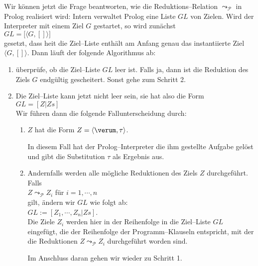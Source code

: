 Wir k\"{o}nnen jetzt die Frage beantworten, wie die Reduktions--Relation
$\leadsto_\mathcal{P}$ in Prolog realisiert wird:  Intern verwaltet Prolog eine Liste
$G\!L$ von Zielen.  Wird der Interpreter mit einem Ziel $G$ gestartet, so wird zun\"{a}chst \\[0.1cm]
\hspace*{1.3cm} $G\!L = \big[ \langle G, [] \rangle \big]$ \\[0.1cm]
gesetzt, dass hei\3t die Ziel--Liste enth\"{a}lt am Anfang genau das instantiierte Ziel $\langle G, [] \rangle$.  Dann l\"{a}uft der
folgende Algorithmus ab:
\begin{enumerate}
\item \"{u}berpr\"{u}fe, ob die Ziel--Liste $G\!L$ leer ist. 
      Falls ja, dann ist die Reduktion des Ziels $G$ endg\"{u}ltig gescheitert.
      Sonst gehe zum  Schritt 2.
\item Die Ziel--Liste kann jetzt nicht leer sein, sie hat also die Form \\[0.1cm]
      \hspace*{1.3cm} $G\!L = [ Z | Zs ]$ \\[0.1cm]
      Wir f\"{u}hren dann die folgende Fallunterscheidung durch:
      \begin{enumerate}
      \item $Z$ hat die Form $Z = \langle \verum, \tau \rangle$.

            In diesem Fall hat der Prolog--Interpreter die ihm gestellte Aufgabe gel\"{o}st und
            gibt die Substitution $\tau$ als Ergebnis aus.
      \item Andernfalls werden alle m\"{o}gliche Reduktionen des Ziels $Z$ durchgef\"{u}hrt.  Falls \\[0.1cm]
            \hspace*{1.3cm} $Z \leadsto_\mathcal{P} Z_i$  f\"{u}r $i=1,\cdots,n$ \\[0.1cm]
            gilt,  \"{a}ndern wir $G\!L$ wie folgt ab: \\[0.1cm]
            \hspace*{1.3cm} $G\!L := [ Z_1, \cdots, Z_n | Zs ]$. \\[0.1cm]
            Die Ziele $Z_i$ werden hier in der  Reihenfolge in die Ziel--Liste $G\!L$ eingef\"{u}gt, die der
            Reihenfolge der Programm--Klauseln entspricht, mit der die Reduktionen 
            $Z \leadsto_\mathcal{P} Z_i$
            durchgef\"{u}hrt worden sind.

            Im Anschluss daran gehen wir wieder zu Schritt 1.
      \end{enumerate}
\end{enumerate}
